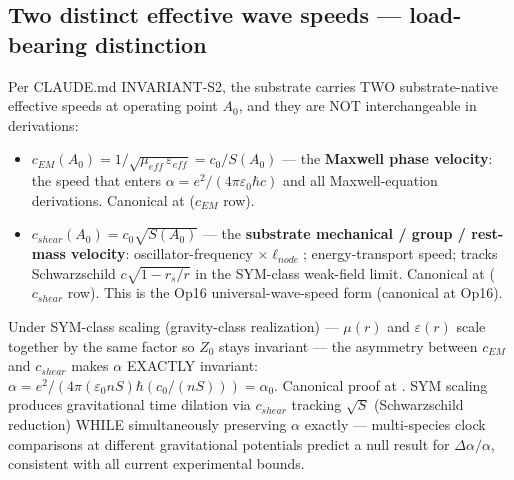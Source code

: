 \subsection{Two distinct effective wave speeds --- load-bearing distinction}

Per CLAUDE.md INVARIANT-S2, the substrate carries TWO substrate-native effective speeds at operating point $A_0$, and they are NOT interchangeable in derivations:

\begin{itemize}
    \item $\boxed{c_{EM}(A_0) = 1/\sqrt{\mu_{eff}\,\varepsilon_{eff}} = c_0/S(A_0)}$ --- the \textbf{Maxwell phase velocity}: the speed that enters $\alpha = e^2/(4\pi\varepsilon_0\hbar c)$ and all Maxwell-equation derivations. Canonical at  ($c_{EM}$ row).
    \item $\boxed{c_{shear}(A_0) = c_0\sqrt{S(A_0)}}$ --- the \textbf{substrate mechanical / group / rest-mass velocity}: oscillator-frequency $\times \ell_{node}$; energy-transport speed; tracks Schwarzschild $c\sqrt{1 - r_s/r}$ in the SYM-class weak-field limit. Canonical at  ($c_{shear}$ row). This is the Op16 universal-wave-speed form (canonical at  Op16).
\end{itemize}

Under SYM-class scaling (gravity-class realization) --- $\mu(r)$ and $\varepsilon(r)$ scale together by the same factor so $Z_0$ stays invariant --- the asymmetry between $c_{EM}$ and $c_{shear}$ makes $\alpha$ EXACTLY invariant: $\alpha = e^2/(4\pi(\varepsilon_0 nS)\hbar(c_0/(nS))) = \alpha_0$. Canonical proof at . SYM scaling produces gravitational time dilation via $c_{shear}$ tracking $\sqrt{S}$ (Schwarzschild reduction) WHILE simultaneously preserving $\alpha$ exactly --- multi-species clock comparisons at different gravitational potentials predict a null result for $\Delta\alpha/\alpha$, consistent with all current experimental bounds.


